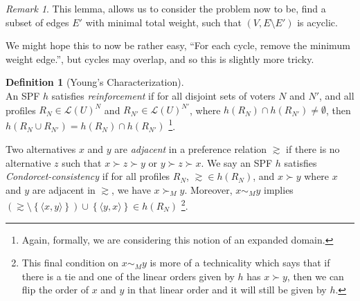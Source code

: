 \documentclass{book}
\theoremstyle{plain}
\theoremstyle{definition}
\newtheorem{definition}[theorem]{Definition}
\theoremstyle{remark}
\newtheorem{remark}[theorem]{Remark}
\newtheorem*{comment}{Comment}
\newcommand{\set}[1]{\left\{#1\right\}}
\begin{document}

\begin{remark}
    This lemma, allows us to consider the problem now
    to be, 
    find a subset of edges $E'$ with minimal total weight,
    such that $(V, E \setminus E')$ is acyclic.

    We might hope this to now be rather easy, 
    ``For each cycle, remove the minimum weight edge.'', 
    but cycles may overlap, and so this is slightly more tricky.
\end{remark}

\begin{definition}[Young's Characterization]
    \leavevmode \\
    An SPF $h$ satisfies \emph{reinforcement} if
    for all 
    disjoint sets of voters $N$ and $N'$,
    and all profiles $R_N \in \mathcal{L}(U)^N$ and $R_{N'} \in \mathcal{L}(U)^{N'}$,
    where $h(R_N) \cap h(R_{N'}) \neq \emptyset$,
    then $h(R_N \cup R_{N'}) = h(R_N) \cap h(R_{N'})$
    \footnote{Again, formally, we are considering this notion of an expanded domain.}.
    
    Two alternatives $x$ and $y$ are \emph{adjacent}
    in a preference relation $\gtrsim$ if there is no alternative 
    $z$ such that $x \succ z \succ y$ or $y \succ z \succ x$.
    We say an SPF $h$ satisfies \emph{Condorcet-consistency} if 
    for all profiles $R_N$, 
    $\gtrsim \in h(R_N)$, and $x \succ y$ where $x$ and $y$ are 
    adjacent in $\gtrsim$, we have $x \succ_M y$.
    Moreover, 
    $x \sim_M y$ implies $(\gtrsim \setminus \set{\langle x, y \rangle}) \cup \set{\langle y, x \rangle} \in h(R_N)$
    \footnote{This final condition on $x \sim_M y$ is more of a technicality which says that 
    if there is a tie and one of the linear orders given by 
    $h$ has $x \succ y$, then we can flip the order of $x$ and $y$ in that linear order and it will still be given by $h$.}.
\end{definition}
\end{document}
